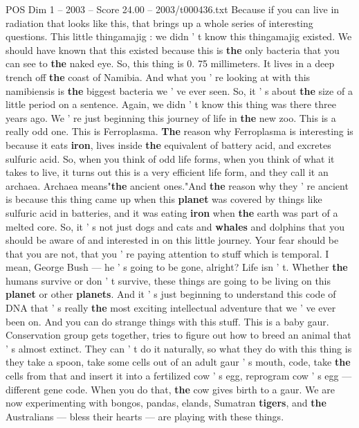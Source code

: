 \begin{textsample}{POS Dim 1 – 2003 – Score 24.00 – 2003/t000436.txt}
Because if you can live in radiation that looks like this, that brings up a whole series of interesting questions.
This little thingamajig : we didn ' t know this thingamajig existed.
We should have known that this existed because this is \textbf{the} only bacteria that you can see to \textbf{the} naked eye.
So, this thing is 0. 75 millimeters.
It lives in a deep trench off \textbf{the} coast of Namibia.
And what you ' re looking at with this namibiensis is \textbf{the} biggest bacteria we ' ve ever seen.
So, it ' s about \textbf{the} size of a little period on a sentence.
Again, we didn ' t know this thing was there three years ago.
We ' re just beginning this journey of life in \textbf{the} new zoo.
This is a really odd one.
This is Ferroplasma. \textbf{The} reason why Ferroplasma is interesting is because it eats \textbf{iron}, lives inside \textbf{the} equivalent of battery acid, and excretes sulfuric acid.
So, when you think of odd life forms, when you think of what it takes to live, it turns out this is a very efficient life form, and they call it an archaea.
Archaea means"\textbf{the} ancient ones."And \textbf{the} reason why they ' re ancient is because this thing came up when this \textbf{planet} was covered by things like sulfuric acid in batteries, and it was eating \textbf{iron} when \textbf{the} earth was part of a melted core.
So, it ' s not just dogs and cats and \textbf{whales} and dolphins that you should be aware of and interested in on this little journey.
Your fear should be that you are not, that you ' re paying attention to stuff which is temporal.
I mean, George Bush — he ' s going to be gone, alright?
Life isn ' t.
Whether \textbf{the} humans survive or don ' t survive, these things are going to be living on this \textbf{planet} or other \textbf{planets}.
And it ' s just beginning to understand this code of DNA that ' s really \textbf{the} most exciting intellectual adventure that we ' ve ever been on.
And you can do strange things with this stuff.
This is a baby gaur.
Conservation group gets together, tries to figure out how to breed an animal that ' s almost extinct.
They can ' t do it naturally, so what they do with this thing is they take a spoon, take some cells out of an adult gaur ' s mouth, code, take \textbf{the} cells from that and insert it into a fertilized cow ' s egg, reprogram cow ' s egg — different gene code.
When you do that, \textbf{the} cow gives birth to a gaur.
We are now experimenting with bongos, pandas, elands, Sumatran \textbf{tigers}, and \textbf{the} Australians — bless their hearts — are playing with these things.

\end{textsample}
